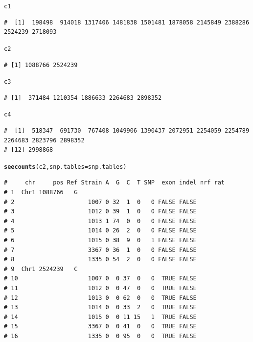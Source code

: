 \documentclass{article}\usepackage[]{graphicx}\usepackage[]{color}
\makeatletter
\newcommand{\hlstd}[1]{\textcolor[rgb]{0.345,0.345,0.345}{#1}}%
\newcommand{\hlkwc}[1]{\textcolor[rgb]{0.333,0.667,0.333}{#1}}%
\newcommand{\hlkwd}[1]{\textcolor[rgb]{0.737,0.353,0.396}{\textbf{#1}}}%
\newenvironment{kframe}{%
 \def\at@end@of@kframe{}%
 \ifinner\ifhmode%
  \def\at@end@of@kframe{\end{minipage}}%
  \begin{minipage}{\columnwidth}%
 \fi\fi%
 \def\FrameCommand##1{\hskip\@totalleftmargin \hskip-\fboxsep
 \colorbox{shadecolor}{##1}\hskip-\fboxsep
     \hskip-\linewidth \hskip-\@totalleftmargin \hskip\columnwidth}%
 \MakeFramed {\advance\hsize-\width
   \@totalleftmargin\z@ \linewidth\hsize
   \@setminipage}}%
 {\par\unskip\endMakeFramed%
 \at@end@of@kframe}
\newenvironment{knitrout}{}{} %
\makeatother
\begin{document}
\begin{knitrout}
\begin{kframe}
\begin{alltt}
\hlstd{c1}
\end{alltt}
\begin{verbatim}
#  [1]  198498  914018 1317406 1481838 1501481 1878058 2145849 2388286 2524239 2718093
\end{verbatim}
\begin{alltt}
\hlstd{c2}
\end{alltt}
\begin{verbatim}
# [1] 1088766 2524239
\end{verbatim}
\begin{alltt}
\hlstd{c3}
\end{alltt}
\begin{verbatim}
# [1]  371484 1210354 1886633 2264683 2898352
\end{verbatim}
\begin{alltt}
\hlstd{c4}
\end{alltt}
\begin{verbatim}
#  [1]  518347  691730  767408 1049906 1390437 2072951 2254059 2254789 2264683 2823796 2898352
# [12] 2998868
\end{verbatim}
\begin{alltt}
\hlkwd{seecounts}\hlstd{(c2,}\hlkwc{snp.tables}\hlstd{=snp.tables)}
\end{alltt}
\begin{verbatim}
#     chr     pos Ref Strain A  G  C  T SNP  exon indel nrf rat
# 1  Chr1 1088766   G                                          
# 2                     1007 0 32  1  0   0 FALSE FALSE        
# 3                     1012 0 39  1  0   0 FALSE FALSE        
# 4                     1013 1 74  0  0   0 FALSE FALSE        
# 5                     1014 0 26  2  0   0 FALSE FALSE        
# 6                     1015 0 38  9  0   1 FALSE FALSE        
# 7                     3367 0 36  1  0   0 FALSE FALSE        
# 8                     1335 0 54  2  0   0 FALSE FALSE        
# 9  Chr1 2524239   C                                          
# 10                    1007 0  0 37  0   0  TRUE FALSE        
# 11                    1012 0  0 47  0   0  TRUE FALSE        
# 12                    1013 0  0 62  0   0  TRUE FALSE        
# 13                    1014 0  0 33  2   0  TRUE FALSE        
# 14                    1015 0  0 11 15   1  TRUE FALSE        
# 15                    3367 0  0 41  0   0  TRUE FALSE        
# 16                    1335 0  0 95  0   0  TRUE FALSE
\end{verbatim}
\end{kframe}
\end{knitrout}
\end{document}
